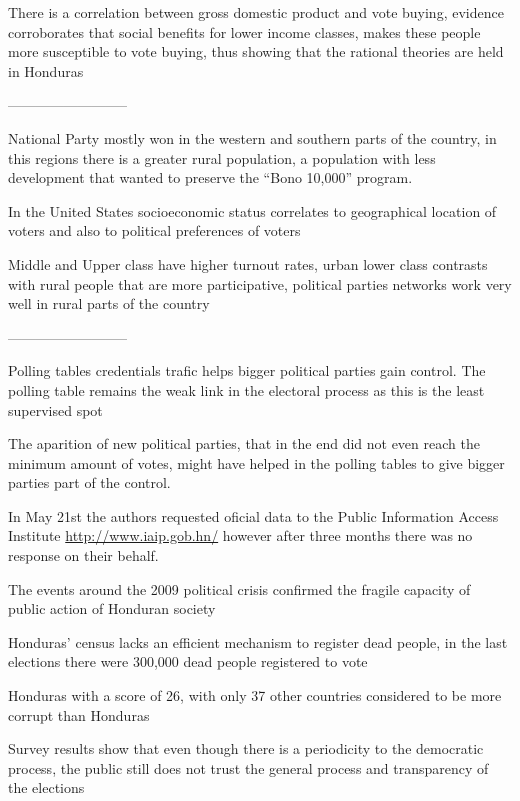 \documentclass[a4paper,10pt]{article}
\begin{document}
There is a correlation between gross domestic product and vote buying, evidence corroborates that social benefits for lower income classes, makes these people more susceptible to vote buying, thus showing that the rational theories are held in Honduras \citep{gonza2014}

--------------------------

National Party mostly won in the western and southern parts of the country, in this regions there is a greater rural population, a population with less development that wanted to preserve the ``Bono 10,000'' program.

In the United States socioeconomic status correlates to geographical location of voters and also to political preferences of voters \citep{osborn2010}

Middle and Upper class have higher turnout rates, urban lower class contrasts with rural people that are more participative, political parties networks work very well in rural parts of the country \citep{romero2014}

--------------------------

Polling tables credentials trafic helps bigger political parties gain control. The polling table remains the weak link in the electoral process as this is the least supervised spot \citep{romero2014}

The aparition of new political parties, that in the end did not even reach the minimum amount of votes, might have helped in the polling tables to give bigger parties part of the control.

In May 21st the authors requested oficial data to the Public Information Access Institute \url{http://www.iaip.gob.hn/} however after three months there was no response on their behalf.

The events around the 2009 political crisis confirmed the fragile capacity of public action of Honduran society \citep{romero2014}

Honduras' census lacks an efficient mechanism to register dead people, in the last elections there were 300,000 dead people registered to vote \citep{romero2014}

Honduras with a score of 26, with only 37 other countries considered to be more corrupt than Honduras \citep{transp}

Survey results show that even though there is a periodicity to the democratic process, the public still does not trust the general process and transparency of the elections \citep{romero2014}
\end{document}
